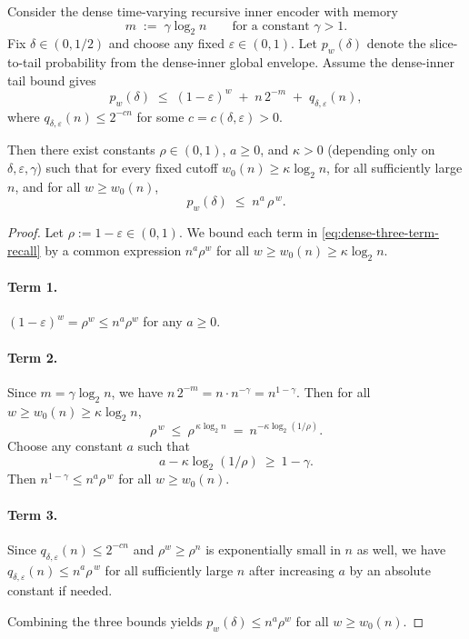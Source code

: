 \begin{corollary}
\label{cor:dense-inner-geometric-cutoff}
Consider the dense time-varying recursive inner encoder with memory
\[
m \;:=\; \gamma \log_2 n
\qquad\text{for a constant }\gamma>1.
\]
Fix $\delta\in(0,1/2)$ and choose any fixed $\varepsilon\in(0,1)$.
Let $p_w(\delta)$ denote the slice-to-tail probability from the dense-inner global envelope.
Assume the dense-inner tail bound gives
\begin{equation}
\label{eq:dense-three-term-recall}
p_w(\delta)
\;\le\;
(1-\varepsilon)^w \;+\; n\,2^{-m} \;+\; q_{\delta,\varepsilon}(n),
\end{equation}
where $q_{\delta,\varepsilon}(n)\le 2^{-c n}$ for some $c=c(\delta,\varepsilon)>0$.

Then there exist constants $\rho\in(0,1)$, $a\ge 0$, and $\kappa>0$
(depending only on $\delta,\varepsilon,\gamma$) such that
for every fixed cutoff $w_0(n)\ge \kappa\log_2 n$,
for all sufficiently large $n$, and for all $w\ge w_0(n)$,
\[
p_w(\delta)\;\le\; n^{a}\,\rho^{\,w}.
\]
\end{corollary}

\begin{proof}
Let $\rho:=1-\varepsilon\in(0,1)$.
We bound each term in \eqref{eq:dense-three-term-recall} by a common expression $n^a\rho^w$ for all
$w\ge w_0(n)\ge \kappa\log_2 n$.

\paragraph{Term 1.}
$(1-\varepsilon)^w=\rho^w\le n^a\rho^w$ for any $a\ge 0$.

\paragraph{Term 2.}
Since $m=\gamma\log_2 n$, we have $n\,2^{-m}=n\cdot n^{-\gamma}=n^{1-\gamma}$.
Then for all $w\ge w_0(n)\ge \kappa\log_2 n$,
\[
\rho^{\,w}\ \le\ \rho^{\,\kappa\log_2 n}
\ =\ n^{-\kappa\log_2(1/\rho)}.
\]
Choose any constant $a$ such that
\[
a - \kappa\log_2(1/\rho)\ \ge\ 1-\gamma.
\]
Then $n^{1-\gamma}\le n^{a}\rho^{\,w}$ for all $w\ge w_0(n)$.

\paragraph{Term 3.}
Since $q_{\delta,\varepsilon}(n)\le 2^{-cn}$ and $\rho^w\ge \rho^n$ is exponentially small in $n$ as well,
we have $q_{\delta,\varepsilon}(n)\le n^{a}\rho^{\,w}$ for all sufficiently large $n$ after increasing $a$ by an absolute constant if needed.

Combining the three bounds yields $p_w(\delta)\le n^a\rho^w$ for all $w\ge w_0(n)$.
\end{proof}

